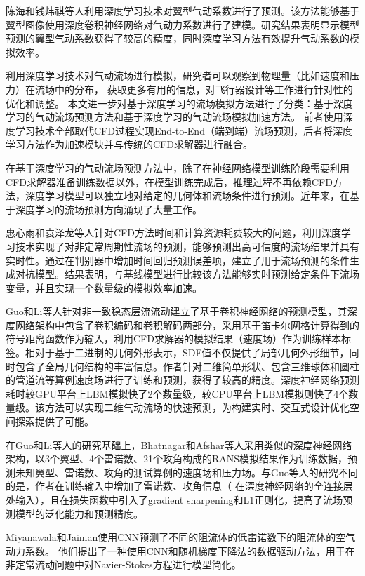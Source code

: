 陈海和钱炜祺等人\cite{陈海2018}利用深度学习技术对翼型气动系数进行了预测。该方法能够基于翼型图像使用深度卷积神经网络对气动力系数进行了建模。研究结果表明显示模型预测的翼型气动系数获得了较高的精度，同时深度学习方法有效提升气动系数的模拟效率。

利用深度学习技术对气动流场进行模拟，研究者可以观察到物理量（比如速度和压力）在流场中的分布，
获取更多有用的信息，对飞行器设计等工作进行针对性的优化和调整。
本文进一步对基于深度学习的流场模拟方法进行了分类：基于深度学习的气动流场预测方法和基于深度学习的气动流场模拟加速方法。
前者使用深度学习技术全部取代CFD过程实现End-to-End（端到端）流场预测，后者将深度学习方法作为加速模块并与传统的CFD求解器进行融合。

在基于深度学习的气动流场预测方法中，除了在神经网络模型训练阶段需要利用CFD求解器准备训练数据以外，在模型训练完成后，推理过程不再依赖CFD方法，深度学习模型可以独立地对给定的几何体和流场条件进行预测。近年来，在基于深度学习的流场预测方向涌现了大量工作。

惠心雨和袁泽龙等人\cite{惠心雨2019}针对CFD方法时间和计算资源耗费较大的问题，利用深度学习技术实现了对非定常周期性流场的预测，能够预测出高可信度的流场结果并具有实时性。通过在判别器中增加时间回归预测误差项，建立了用于流场预测的条件生成对抗模型。结果表明，与基线模型进行比较该方法能够实时预测给定条件下流场变量，并且实现一个数量级的模拟效率加速。

Guo和Li等人\cite{DBLP:conf/kdd/GuoLI16}针对非一致稳态层流流动建立了基于卷积神经网络的预测模型，其深度网络架构中包含了卷积编码和卷积解码两部分，采用基于笛卡尔网格计算得到的符号距离函数作为输入，利用CFD求解器的模拟结果（速度场）作为训练样本标签。相对于基于二进制的几何外形表示，SDF值不仅提供了局部几何外形细节，同时包含了全局几何结构的丰富信息。作者针对二维简单形状、包含三维球体和圆柱的管道流等算例速度场进行了训练和预测，获得了较高的精度。深度神经网络预测耗时较GPU平台上LBM模拟快了2个数量级，较CPU平台上LBM模拟则快了4个数量级。该方法可以实现二维气动流场的快速预测，为构建实时、交互式设计优化空间探索提供了可能。

在Guo和Li等人的研究基础上，Bhatnagar和Afshar等人\cite{bhatnagar2019prediction}采用类似的深度神经网络架构，以3个翼型、4个雷诺数、21个攻角构成的RANS模拟结果作为训练数据，预测未知翼型、雷诺数、攻角的测试算例的速度场和压力场。与Guo等人的研究不同的是，作者在训练输入中增加了雷诺数、攻角信息（ 在深度神经网络的全连接层处输入），且在损失函数中引入了gradient sharpening和L1正则化，提高了流场预测模型的泛化能力和预测精度。

Miyanawala和Jaiman\cite{2017An}使用CNN预测了不同的阻流体的低雷诺数下的阻流体的空气动力系数。 他们提出了一种使用CNN和随机梯度下降法的数据驱动方法，用于在非定常流动问题中对Navier-Stokes方程进行模型简化。

